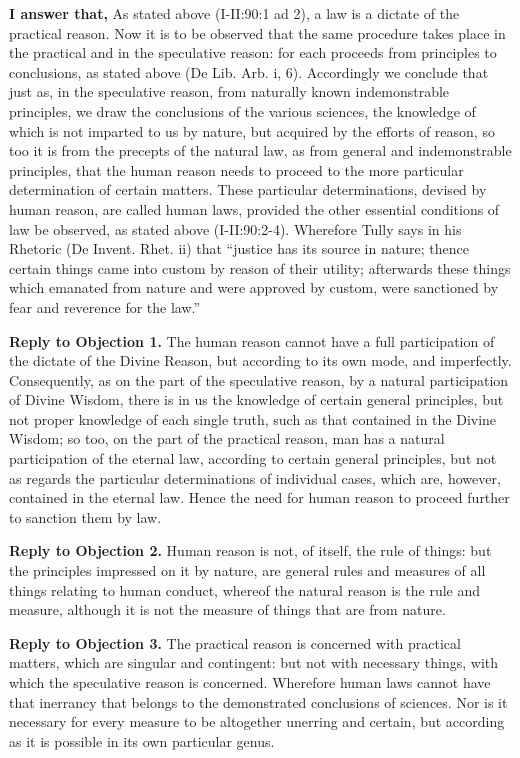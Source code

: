 \textbf{I answer that,} As stated above (I-II:90:1 ad 2), a law is a dictate of the practical reason. Now it is to be observed that the same procedure takes place in the practical and in the speculative reason: for each proceeds from principles to conclusions, as stated above (De Lib. Arb. i, 6). Accordingly we conclude that just as, in the speculative reason, from naturally known indemonstrable principles, we draw the conclusions of the various sciences, the knowledge of which is not imparted to us by nature, but acquired by the efforts of reason, so too it is from the precepts of the natural law, as from general and indemonstrable principles, that the human reason needs to proceed to the more particular determination of certain matters. These particular determinations, devised by human reason, are called human laws, provided the other essential conditions of law be observed, as stated above (I-II:90:2-4). Wherefore Tully says in his Rhetoric (De Invent. Rhet. ii) that ``justice has its source in nature; thence certain things came into custom by reason of their utility; afterwards these things which emanated from nature and were approved by custom, were sanctioned by fear and reverence for the law.''

\textbf{Reply to Objection 1.} The human reason cannot have a full participation of the dictate of the Divine Reason, but according to its own mode, and imperfectly. Consequently, as on the part of the speculative reason, by a natural participation of Divine Wisdom, there is in us the knowledge of certain general principles, but not proper knowledge of each single truth, such as that contained in the Divine Wisdom; so too, on the part of the practical reason, man has a natural participation of the eternal law, according to certain general principles, but not as regards the particular determinations of individual cases, which are, however, contained in the eternal law. Hence the need for human reason to proceed further to sanction them by law.

\textbf{Reply to Objection 2.} Human reason is not, of itself, the rule of things: but the principles impressed on it by nature, are general rules and measures of all things relating to human conduct, whereof the natural reason is the rule and measure, although it is not the measure of things that are from nature.

\textbf{Reply to Objection 3.} The practical reason is concerned with practical matters, which are singular and contingent: but not with necessary things, with which the speculative reason is concerned. Wherefore human laws cannot have that inerrancy that belongs to the demonstrated conclusions of sciences. Nor is it necessary for every measure to be altogether unerring and certain, but according as it is possible in its own particular genus.

